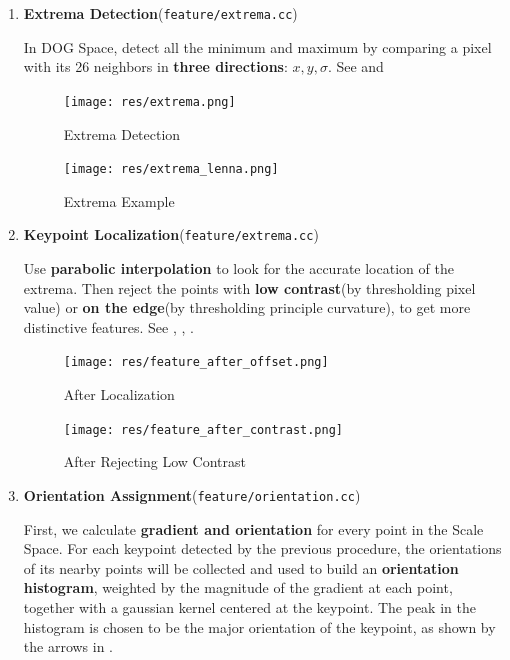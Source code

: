 \begin{enumerate}
  \item \textbf{Extrema Detection}(\verb|feature/extrema.cc|)

    In DOG Space, detect all the minimum and maximum
    by comparing a pixel with its 26 neighbors in \textbf{three directions}: $ x, y, \sigma$.
    See  and 
    \begin{figure}[H]
      \begin{minipage}[b]{0.46\linewidth}
        \centering
        \texttt{[image: res/extrema.png]}
        \caption{Extrema Detection\label{fig:extrema}}
      \end{minipage}
      \hspace{1em}
      \begin{minipage}[b]{0.46\linewidth}
        \centering
        \texttt{[image: res/extrema\_lenna.png]}
        \caption{Extrema Example\label{fig:extrema2}}
      \end{minipage}
    \end{figure}

  \item \textbf{Keypoint Localization}(\verb|feature/extrema.cc|)

    Use \textbf{parabolic interpolation} to look for the accurate location of the extrema.
    Then reject the points with \textbf{low contrast}(by thresholding pixel value)
    or \textbf{on the edge}(by thresholding principle curvature), to get more distinctive features.
    See , , .
    \begin{figure}[H]
      \begin{minipage}[b]{0.46\linewidth}
        \centering
        \texttt{[image: res/feature\_after\_offset.png]}
        \caption{After Localization \label{fig:feature1}}
      \end{minipage}
      \hspace{1em}
      \begin{minipage}[b]{0.46\linewidth}
        \centering
        \texttt{[image: res/feature\_after\_contrast.png]}
        \caption{After Rejecting Low Contrast\label{fig:feature2}}
      \end{minipage}
    \end{figure}

  \item \textbf{Orientation Assignment}(\verb|feature/orientation.cc|)
    \label{sec:orientation_assign}

    First, we calculate \textbf{gradient and orientation} for every point in the Scale Space.
    For each keypoint detected by the previous procedure,
    the orientations of its nearby points will be collected and used to build an \textbf{orientation histogram},
    weighted by the magnitude of the gradient at each point, together with a gaussian kernel centered at the keypoint.
    The peak in the histogram is chosen to be the major orientation of the keypoint, as shown by the arrows in .


\end{enumerate}
